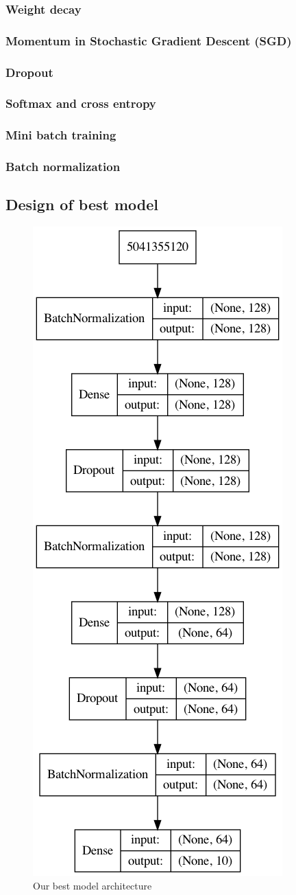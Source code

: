 \documentclass[landscape,twocolumn]{article}
\begin{document}
\subsubsection{Weight decay}
\subsubsection{Momentum in Stochastic Gradient Descent (SGD)}
\subsubsection{Dropout}
\subsubsection{Softmax and cross entropy}
\subsubsection{Mini batch training}
\subsubsection{Batch normalization}
\subsection{Design of best model}
\begin{figure}
\includegraphics[width=0.5\columnwidth]{model}
\caption{Our best model architecture \label{fig:model}}
\end{figure}
\end{document}

